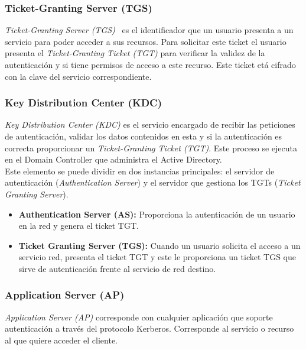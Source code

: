 \subsubsection{Ticket-Granting Server (TGS)}

{\it Ticket-Granting Server (TGS)}~\cite{Capitulo3:TGT} es el identificador que un usuario presenta a un servicio para poder acceder a sus recursos. Para solicitar este ticket el usuario presenta el {\it Ticket-Granting Ticket (TGT)} para verificar la validez de la au\-ten\-ti\-ca\-ción y si tiene permisos de acceso a este recurso. Este ticket etá cifrado con la clave del servicio correspondiente.

\subsubsection{Key Distribution Center (KDC)} 

{\it Key Distribution Center (KDC)} es el servicio encargado de recibir las peticiones de au\-ten\-ti\-ca\-ción, validar los datos contenidos en esta y si la au\-ten\-ti\-ca\-ción es correcta proporcionar un {\it Ticket-Granting Ticket (TGT)}. Este proceso se ejecuta en el Domain Controller que administra el Active Directory. \\

Este elemento se puede dividir en dos instancias principales: el servidor de au\-ten\-ti\-ca\-ción ({\it Authentication Server}) y el servidor que gestiona los TGTs ({\it Ticket Granting Server}). 

\begin{itemize}
\item \textbf{Authentication Server (AS):} Proporciona la au\-ten\-ti\-ca\-ción de un usuario en la red y genera el ticket TGT. 
\item \textbf{Ticket Granting Server (TGS):} Cuando un usuario solicita el acceso a un servicio red, presenta el ticket TGT y este le proporciona un ticket TGS que sirve de au\-ten\-ti\-ca\-ción frente al servicio de red destino. 
\end{itemize}

\subsubsection{Application Server (AP)}

{\it Application Server (AP)} corresponde con cualquier aplicación que soporte au\-ten\-ti\-ca\-ción a través del protocolo Kerberos. Corresponde al servicio o recurso al que quiere acceder el cliente. 

